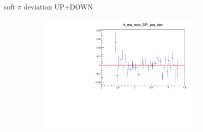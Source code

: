 \documentclass[11pt]{beamer}
\begin{document}
\begin{frame}{soft $\pi$ deviation UP+DOWN}
\begin{figure}
\begin{subfigure}{0.45\textwidth}
\end{subfigure}
\begin{subfigure}{0.45\textwidth}
\includegraphics[width=0.9\textwidth]{fourth/up_plus_down_pdf/eta_2.pdf}
\end{subfigure}
\end{figure}
\end{frame}
\end{document}
